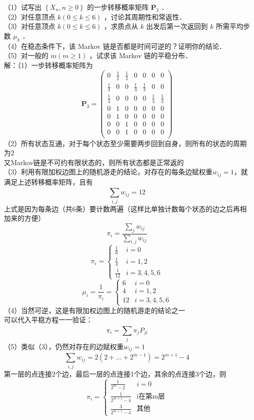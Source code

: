 \documentclass[UTF8]{ctexart}
\begin{document}
\noindent （1）试写出 $\left\{X_{n}, n \geq 0\right\}$ 的一步转移概率矩阵 $\bm{P}_3$ ．\\
（2）对任意顶点 $k(0 \leq k \leq 6)$ ，讨论其周期性和常返性．\\
（3）对任意顶点 $k(0 \leq k \leq 6)$ ，求质点从 $k$ 出发后第一次返回到 $k$ 所需平均步数 $\mu_{k}$ ．\\
（4）在稳态条件下，该 Markov 链是否都是时间可逆的？证明你的结论．\\
（5）对一般的 $m(m \geq 1)$ ，试求该 Markov 链的平稳分布．\\
解：（1）一步转移概率矩阵为
\[
\bm{P}_3=
\begin{pmatrix}
	0 & \frac{1}{2} &\frac{1}{2} & 0 &0 &0&0\\
	\frac{1}{3} & 0&0 & \frac{1}{3} &\frac{1}{3} &0&0\\
	\frac{1}{3} & 0&0 & 0 &0 &\frac{1}{3}&\frac{1}{3}\\
	0 & 1 &0 & 0 &0 &0&0\\
	0 & 1 &0 & 0 &0 &0&0\\
	0 & 0&1 & 0 &0 &0&0\\
	0 & 0&1 & 0 &0 &0&0\\
\end{pmatrix}
\]
（2）所有状态互通，对于每个状态至少需要两步回到自身，则所有的状态的周期为2\\
又Markov链是不可约有限状态的，则所有状态都是正常返的\\
（3）利用有限加权边图上的随机游走的结论，对存在的每条边赋权重$w_{ij}=1$，就满足上述转移概率矩阵，且有\\
\[
\sum\limits_{i,j}^{} w_{ij}=12
\]
上式是因为每条边（共6条）要计数两遍（这样比单独计数每个状态的边之后再相加来的方便）\\
\[
\pi_i=\frac{\sum\limits_{j}^{} w_{ij}}{\sum\limits_{i,j}^{} w_{ij}}
\]
\[
\pi_i=
\begin{cases}
	\frac{1}{6}  &  i=0 \\
	\frac{1}{4} &  i=1,2\\
	\frac{1}{12} & i=3,4,5,6
\end{cases}
\]
\[
\mu_i=\frac{1}{\pi_i}=
\begin{cases}
	6  &  i=0 \\
	4 &  i=1,2\\
	12 & i=3,4,5,6
\end{cases}
\]
（4）当然可逆，这是有限加权边图上的随机游走的结论之一\\
可以代入平稳方程一一验证：\\
\[
\pi_i=\sum\limits_{j}^{} \pi_j P_{ji}
\]
（5）类似（3），仍然对存在的边赋权重$w_{ij}=1$\\
\[
\sum\limits_{i,j}^{} w_{ij}=2(2+\dots+2^{m-1})=2^{m+1}-4
\]
第一层的点连接2个边，最后一层的点连接1个边，其余的点连接3个边，则\\
\[
\pi_i=
\begin{cases}
	\frac{1}{2^m-2}  &  i=0 \\
	\frac{1}{2^{m+1}-4} &  \text{i在第m层}\\
	\frac{3}{2^{m+1}-4} & \text{其他}
\end{cases}
\]\\
\end{document}
